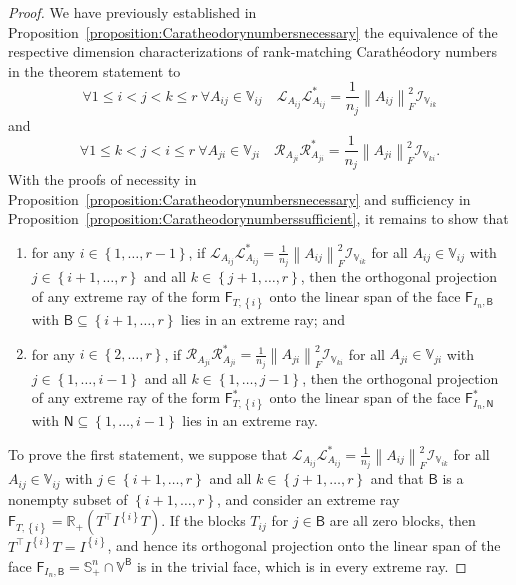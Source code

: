 \documentclass[oneside]{amsart}
\theoremstyle{plain}
\theoremstyle{definition}
\theoremstyle{remark}
\numberwithin{equation}{section}
\begin{document}
\begin{proof}
We have previously established in
Proposition~\ref{proposition:Caratheodorynumbersnecessary} the equivalence
of the respective dimension characterizations of rank-matching
Carath\'eodory numbers in the theorem statement to
\[
\forall 1 \leq i < j < k \leq r \ \forall A_{ij} \in \mathbb{V}_{ij} \quad
\mathcal{L}_{A_{ij}} \mathcal{L}^{*}_{A_{ij}} = \frac{1}{n_{j}} \left\lVert
A_{ij}\right\rVert_{F}^{2} \mathcal{I}_{\mathbb{V}_{ik}}
\]
and
\[
\forall 1 \leq k < j < i \leq r \ \forall A_{ji} \in \mathbb{V}_{ji} \quad
\mathcal{R}_{A_{ji}} \mathcal{R}^{*}_{A_{ji}} = \frac{1}{n_{j}} \left\lVert
A_{ji}\right\rVert_{F}^{2} \mathcal{I}_{\mathbb{V}_{ki}}.
\]
With the proofs of necessity in
Proposition~\ref{proposition:Caratheodorynumbersnecessary} and sufficiency
in Proposition~\ref{proposition:Caratheodorynumberssufficient}, it remains
to show that
\begin{enumerate}[label=(\roman*)]
\item for any $i \in \left\{1, \dotsc, r-1\right\}$, if
$\mathcal{L}_{A_{ij}} \mathcal{L}^{*}_{A_{ij}} = \frac{1}{n_{j}}
\left\lVert A_{ij}\right\rVert_{F}^{2} \mathcal{I}_{\mathbb{V}_{ik}}$ for
all $A_{ij} \in \mathbb{V}_{ij}$ with $j \in \left\{i+1, \dotsc, r\right\}$
and all $k \in \left\{j+1, \dotsc, r\right\}$, then the orthogonal
projection of any extreme ray of the form $\mathsf{F}_{T,\left\{i\right\}}$
onto the linear span of the face $\mathsf{F}_{I_{n},\mathsf{B}}$ with
$\mathsf{B} \subseteq \left\{i+1, \dotsc, r\right\}$ lies in an extreme
ray; and

\item for any $i \in \left\{2, \dotsc, r\right\}$, if $\mathcal{R}_{A_{ji}}
\mathcal{R}^{*}_{A_{ji}} = \frac{1}{n_{j}} \left\lVert
A_{ji}\right\rVert_{F}^{2} \mathcal{I}_{\mathbb{V}_{ki}}$ for all $A_{ji}
\in \mathbb{V}_{ji}$ with $j \in \left\{1, \dotsc, i-1\right\}$ and all $k
\in \left\{1, \dotsc, j-1\right\}$, then the orthogonal projection of any
extreme ray of the form $\mathsf{F}^{*}_{T,\left\{i\right\}}$ onto the
linear span of the face $\mathsf{F}^{*}_{I_{n},\mathsf{N}}$ with
$\mathsf{N} \subseteq \left\{1, \dotsc, i-1\right\}$ lies in an extreme
ray.

\end{enumerate}

To prove the first statement, we suppose that $\mathcal{L}_{A_{ij}}
\mathcal{L}^{*}_{A_{ij}} = \frac{1}{n_{j}} \left\lVert
A_{ij}\right\rVert_{F}^{2} \mathcal{I}_{\mathbb{V}_{ik}}$ for all $A_{ij}
\in \mathbb{V}_{ij}$ with $j \in \left\{i+1, \dotsc, r\right\}$ and all $k
\in \left\{j+1, \dotsc, r\right\}$ and that $\mathsf{B}$ is a nonempty
subset of $\left\{i+1, \dotsc, r\right\}$, and consider an extreme ray
$\mathsf{F}_{T,\left\{i\right\}} = \mathbb{R}_+(T^{\top}
I^{\left\{i\right\}} T)$. If the blocks $T_{ij}$ for $j \in \mathsf{B}$ are
all zero blocks, then $T^{\top} I^{\left\{i\right\}} T =
I^{\left\{i\right\}}$, and hence its orthogonal projection onto the linear
span of the face $\mathsf{F}_{I_{n},\mathsf{B}} = \mathbb{S}^{n}_{+} \cap
\mathbb{V}^{\mathsf{B}}$ is in the trivial face, which is in every extreme
ray.


\end{proof}
\end{document}
